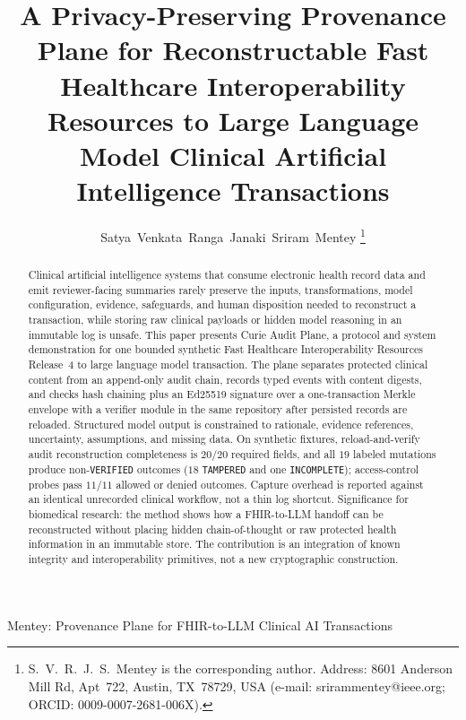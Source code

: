 \documentclass[journal]{IEEEtran}
\begin{document}
\title{A Privacy-Preserving Provenance Plane for Reconstructable Fast Healthcare Interoperability Resources to Large Language Model Clinical Artificial Intelligence Transactions}

\author{Satya~Venkata~Ranga~Janaki~Sriram~Mentey%
\thanks{S.~V.~R.~J.~S.~Mentey is the corresponding author.
Address: 8601 Anderson Mill Rd, Apt~722, Austin, TX~78729, USA
(e-mail: srirammentey@ieee.org; ORCID: 0009-0007-2681-006X).}}

%
{Mentey: Provenance Plane for FHIR-to-LLM Clinical AI Transactions}

\maketitle

\begin{abstract}
Clinical artificial intelligence systems that consume electronic health record
data and emit reviewer-facing summaries rarely preserve the inputs,
transformations, model configuration, evidence, safeguards, and human
disposition needed to reconstruct a transaction, while storing raw clinical
payloads or hidden model reasoning in an immutable log is unsafe. This paper
presents Curie Audit Plane, a protocol and system demonstration for one
bounded synthetic Fast Healthcare Interoperability Resources Release~4 to
large language model transaction. The plane separates protected clinical
content from an append-only audit chain, records typed events with content
digests, and checks hash chaining plus an Ed25519 signature over a
one-transaction Merkle envelope with a verifier module in the same repository
after persisted records are reloaded. Structured model output is constrained to rationale, evidence
references, uncertainty, assumptions, and missing data. On synthetic
fixtures, reload-and-verify audit reconstruction completeness is $20/20$
required fields, and all $19$ labeled mutations produce non-\texttt{VERIFIED}
outcomes ($18$ \texttt{TAMPERED} and one \texttt{INCOMPLETE}); access-control
probes pass $11/11$ allowed or denied outcomes. Capture
overhead is reported against an identical unrecorded clinical workflow, not a
thin log shortcut. Significance for biomedical research: the method shows how
a FHIR-to-LLM handoff can be reconstructed without placing hidden
chain-of-thought or raw protected health information in an immutable store.
The contribution is an integration of known integrity and interoperability
primitives, not a new cryptographic construction.
\end{abstract}
\end{document}

